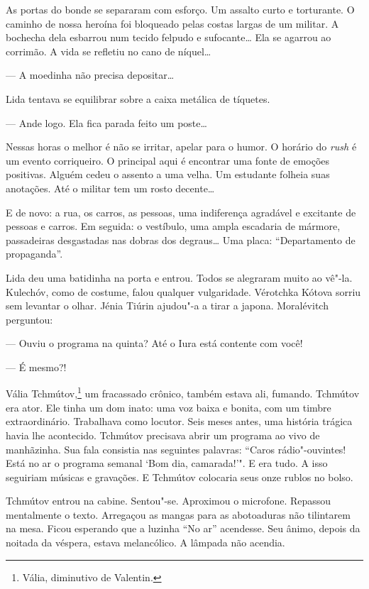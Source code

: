 As portas do bonde se separaram com esforço. Um assalto curto e
torturante. O caminho de nossa heroína foi bloqueado pelas costas largas
de um militar. A bochecha dela esbarrou num tecido felpudo e
sufocante\ldots{} Ela se agarrou ao corrimão. A vida se refletiu no cano de
níquel\ldots{}

--- A moedinha não precisa depositar\ldots{}

Lida tentava se equilibrar sobre a caixa metálica de tíquetes.

--- Ande logo. Ela fica parada feito um poste\ldots{}

Nessas horas o melhor é não se irritar, apelar para o humor. O horário
do \emph{rush} é um evento corriqueiro. O principal aqui é encontrar uma
fonte de emoções positivas. Alguém cedeu o assento a uma velha. Um
estudante folheia suas anotações. Até o militar tem um rosto decente\ldots{}

E de novo: a rua, os carros, as pessoas, uma indiferença agradável e
excitante de pessoas e carros. Em seguida: o vestíbulo, uma ampla
escadaria de mármore, passadeiras desgastadas nas dobras dos degraus\ldots{}
Uma placa: ``Departamento de propaganda''.

Lida deu uma batidinha na porta e entrou. Todos se alegraram muito ao
vê"-la. Kulechóv, como de costume, falou qualquer vulgaridade. Vérotchka
Kótova sorriu sem levantar o olhar. Jénia Tiúrin ajudou"-a a tirar a
japona. Moralévitch perguntou:

--- Ouviu o programa na quinta? Até o Iura está contente com você!

--- É mesmo?!

Vália Tchmútov,\footnote{Vália, diminutivo de Valentin.} um fracassado crônico, também estava ali, fumando.
Tchmútov era ator. Ele tinha um dom inato: uma voz baixa e bonita, com
um timbre extraordinário. Trabalhava como locutor. Seis meses antes, uma
história trágica havia lhe acontecido. Tchmútov precisava abrir um
programa ao vivo de manhãzinha. Sua fala consistia nas seguintes
palavras: ``Caros rádio"-ouvintes! Está no ar o programa semanal `Bom
dia, camarada!'". E era tudo. A isso seguiriam músicas e
gravações. E Tchmútov colocaria seus onze rublos no bolso.

Tchmútov entrou na cabine. Sentou"-se. Aproximou o microfone. Repassou
mentalmente o texto. Arregaçou as mangas para as abotoaduras não
tilintarem na mesa. Ficou esperando que a luzinha ``No ar'' acendesse.
Seu ânimo, depois da noitada da véspera, estava melancólico. A lâmpada
não acendia.

